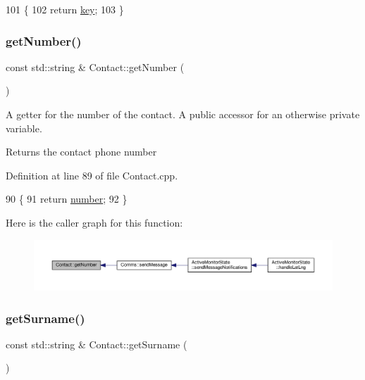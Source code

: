 \begin{DoxyCode}
101 \{
102     \textcolor{keywordflow}{return} \hyperlink{class_contact_a5bc7925e6356e29c9cbad7266f0a4340}{key};
103 \}
\end{DoxyCode}
\mbox{\label{class_contact_a612095b153e05538c32400c4c44cb1aa}} 
\subsubsection{\texorpdfstring{get\+Number()}{getNumber()}}
{\footnotesize\ttfamily const std\+::string \& Contact\+::get\+Number (\begin{DoxyParamCaption}{ }\end{DoxyParamCaption})}

A getter for the number of the contact. A public accessor for an otherwise private variable.

\begin{DoxyReturn}{Returns}
the contact phone number 
\end{DoxyReturn}


Definition at line 89 of file Contact.\+cpp.


\begin{DoxyCode}
90 \{
91     \textcolor{keywordflow}{return} \hyperlink{class_contact_abd24eed27b661da4ab20553443212437}{number};
92 \}
\end{DoxyCode}
Here is the caller graph for this function\+:\nopagebreak
\begin{figure}[H]
\begin{center}
\leavevmode
\includegraphics[width=350pt]{dd/d2a/class_contact_a612095b153e05538c32400c4c44cb1aa_icgraph}
\end{center}
\end{figure}
\mbox{\label{class_contact_aba3d4900ea3173f38b7f296536226bb9}} 
\subsubsection{\texorpdfstring{get\+Surname()}{getSurname()}}
{\footnotesize\ttfamily const std\+::string \& Contact\+::get\+Surname (\begin{DoxyParamCaption}{ }\end{DoxyParamCaption})}

